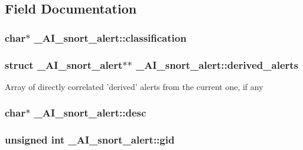 \subsection{Field Documentation}
\hypertarget{struct__AI__snort__alert_aa89585e14acb2c4e684a1552d322632f}{
\subsubsection[{classification}]{\setlength{\rightskip}{0pt plus 5cm}char$\ast$ {\bf \_\-AI\_\-snort\_\-alert::classification}}}
\label{struct__AI__snort__alert_aa89585e14acb2c4e684a1552d322632f}
\hypertarget{struct__AI__snort__alert_aac5e4078600ed17532db1f3d78165390}{
\subsubsection[{derived\_\-alerts}]{\setlength{\rightskip}{0pt plus 5cm}struct {\bf \_\-AI\_\-snort\_\-alert}$\ast$$\ast$ {\bf \_\-AI\_\-snort\_\-alert::derived\_\-alerts}}}
\label{struct__AI__snort__alert_aac5e4078600ed17532db1f3d78165390}
Array of directly correlated 'derived' alerts from the current one, if any \hypertarget{struct__AI__snort__alert_ac0902d7c756ec675fb06347ce4706135}{
\subsubsection[{desc}]{\setlength{\rightskip}{0pt plus 5cm}char$\ast$ {\bf \_\-AI\_\-snort\_\-alert::desc}}}
\label{struct__AI__snort__alert_ac0902d7c756ec675fb06347ce4706135}
\hypertarget{struct__AI__snort__alert_af8408be5da59cda853442dd13465c0f6}{
\subsubsection[{gid}]{\setlength{\rightskip}{0pt plus 5cm}unsigned int {\bf \_\-AI\_\-snort\_\-alert::gid}}}
\label{struct__AI__snort__alert_af8408be5da59cda853442dd13465c0f6}
